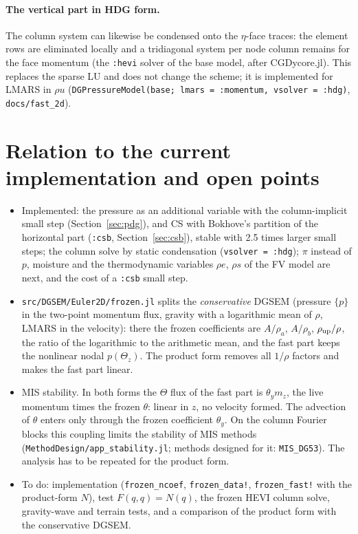 \documentclass[11pt,a4paper]{article}
\newcommand{\code}[1]{\texttt{#1}}
\begin{document}
\paragraph{The vertical part in HDG form.} The column system can likewise be condensed onto the $\eta$-face traces: the element
rows are eliminated locally and a tridiagonal system per node column remains for the face momentum (the \code{:hevi}
solver of the base model, after CGDycore.jl). This replaces the sparse LU and does not change the scheme; it is implemented
for LMARS in $\rho u$ (\code{DGPressureModel(base; lmars = :momentum, vsolver = :hdg)}, \code{docs/fast\_2d}).

\section{Relation to the current implementation and open points}
\begin{itemize}
\item Implemented: the pressure as an additional variable with the column-implicit small step
  (Section~\ref{sec:pdg}), and CS with Bokhove's partition of the horizontal part (\code{:csb}, Section~\ref{sec:csb}),
  stable with 2.5 times larger small steps; the column solve by static condensation (\code{vsolver = :hdg}); $\pi$ instead of $p$, moisture and the thermodynamic variables $\rho e$, $\rho s$ of the
  FV model are next, and the cost of a \code{:csb} small step.
\item \code{src/DGSEM/Euler2D/frozen.jl} splits the \emph{conservative} DGSEM (pressure $\{p\}$ in the
  two-point momentum flux, gravity with a logarithmic mean of $\rho$, LMARS in the velocity): there
  the frozen coefficients are $A/\rho_a$, $A/\rho_b$, $\rho_{\rm up}/\rho$, the ratio of the logarithmic
  to the arithmetic mean, and the fast part keeps the nonlinear nodal $p(\Theta_z)$. The product form
  removes all $1/\rho$ factors and makes the fast part linear.
\item MIS stability. In both forms the $\Theta$ flux of the fast part is $\theta_y m_z$, the live momentum times the
  frozen $\theta$: linear in $z$, no velocity formed. The advection of $\theta$ enters only through the frozen
  coefficient $\theta_y$. On the
  column Fourier blocks this coupling limits the stability of MIS methods
  (\code{MethodDesign/app\_stability.jl}; methods designed for it: \code{MIS\_DG53}). The analysis has to
  be repeated for the product form.
\item To do: implementation (\code{frozen\_ncoef}, \code{frozen\_data!}, \code{frozen\_fast!} with the
  product-form $N$), test $F(q,q)=N(q)$, the frozen HEVI column solve, gravity-wave and terrain tests,
  and a comparison of the product form with the conservative DGSEM.
\end{itemize}
\end{document}
